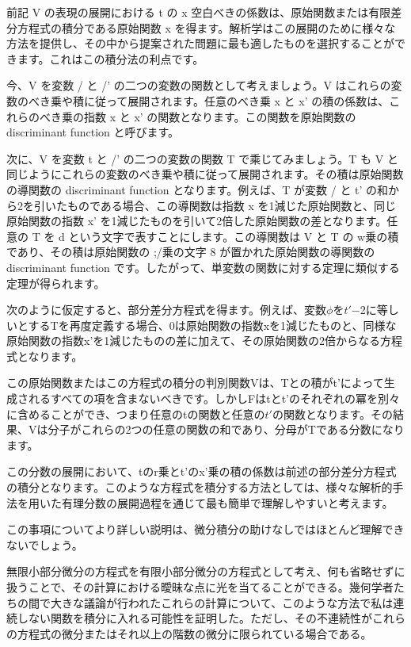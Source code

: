 \documentclass[a4paper,11pt,openany]{ltjsbook}
\begin{document}
前記 V の表現の展開における t の x 空白べきの係数は、原始関数または有限差分方程式の積分である原始関数 x を得ます。解析学はこの展開のために様々な方法を提供し、その中から提案された問題に最も適したものを選択することができます。これはこの積分法の利点です。

今、V を変数 / と /' の二つの変数の関数として考えましょう。V はこれらの変数のべき乗や積に従って展開されます。任意のべき乗 x と x' の積の係数は、これらのべき乗の指数 x と x' の関数となります。この関数を原始関数の discriminant function と呼びます。

次に、V を変数 t と /' の二つの変数の関数 T で乘じてみましょう。T も V と同じようにこれらの変数のべき乗や積に従って展開されます。その積は原始関数の導関数の discriminant function となります。例えば、T が変数 / と t' の和から2を引いたものである場合、この導関数は指数 x を1減じた原始関数と、同じ原始関数の指数 x' を1減じたものを引いて2倍した原始関数の差となります。任意の T を d という文字で表すことにします。この導関数は V と T の w乗の積であり、その積は原始関数の ;/乗の文字 8 が置かれた原始関数の導関数の discriminant function です。したがって、単変数の関数に対する定理に類似する定理が得られます。

次のように仮定すると、部分差分方程式を得ます。例えば、変数$\phi$を$t'$−2に等しいとするTを再度定義する場合、0は原始関数の指数xを1減じたものと、同様な原始関数の指数x'を1減じたものの差に加えて、その原始関数の2倍からなる方程式となります。

この原始関数またはこの方程式の積分の判別関数Vは、Tとの積がt'によって生成されるすべての項を含まないべきです。しかしFはtとt'のそれぞれの冪を別々に含めることができ、つまり任意のtの関数と任意の$t'$の関数となります。その結果、Vは分子がこれらの2つの任意の関数の和であり、分母がTである分数になります。

この分数の展開において、tのr乗とt'のx'乗の積の係数は前述の部分差分方程式の積分となります。このような方程式を積分する方法としては、様々な解析的手法を用いた有理分数の展開過程を通じて最も簡単で理解しやすいと考えます。

この事項についてより詳しい説明は、微分積分の助けなしではほとんど理解できないでしょう。

無限小部分微分の方程式を有限小部分微分の方程式として考え、何も省略せずに扱うことで、その計算における曖昧な点に光を当てることができる。幾何学者たちの間で大きな議論が行われたこれらの計算について、このような方法で私は連続しない関数を積分に入れる可能性を証明した。ただし、その不連続性がこれらの方程式の微分またはそれ以上の階数の微分に限られている場合である。
\end{document}
